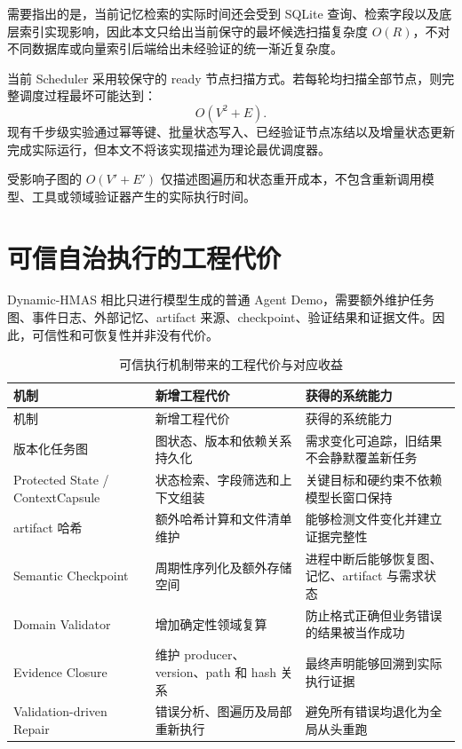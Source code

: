 \documentclass[UTF8,a4paper,12pt,oneside]{ctexbook}
\begin{document}
需要指出的是，当前记忆检索的实际时间还会受到 SQLite 查询、检索字段以及底层索引实现影响，因此本文只给出当前保守的最坏候选扫描复杂度 $O(R)$，不对不同数据库或向量索引后端给出未经验证的统一渐近复杂度。

当前 Scheduler 采用较保守的 ready 节点扫描方式。若每轮均扫描全部节点，则完整调度过程最坏可能达到：
\[
O(V^2+E).
\]
现有千步级实验通过幂等键、批量状态写入、已经验证节点冻结以及增量状态更新完成实际运行，但本文不将该实现描述为理论最优调度器。

受影响子图的 $O(V'+E')$ 仅描述图遍历和状态重开成本，不包含重新调用模型、工具或领域验证器产生的实际执行时间。


\section{可信自治执行的工程代价}

Dynamic-HMAS 相比只进行模型生成的普通 Agent Demo，需要额外维护任务图、事件日志、外部记忆、artifact 来源、checkpoint、验证结果和证据文件。因此，可信性和可恢复性并非没有代价。

\begin{longtable}{p{}p{}p{}}
\caption{可信执行机制带来的工程代价与对应收益}
\label{tab:engineering-cost}\\
\toprule
机制 & 新增工程代价 & 获得的系统能力\\
\midrule
\endfirsthead

\toprule
机制 & 新增工程代价 & 获得的系统能力\\
\midrule
\endhead

版本化任务图
&
图状态、版本和依赖关系持久化
&
需求变化可追踪，旧结果不会静默覆盖新任务
\\

Protected State / ContextCapsule
&
状态检索、字段筛选和上下文组装
&
关键目标和硬约束不依赖模型长窗口保持
\\

artifact 哈希
&
额外哈希计算和文件清单维护
&
能够检测文件变化并建立证据完整性
\\

Semantic Checkpoint
&
周期性序列化及额外存储空间
&
进程中断后能够恢复图、记忆、artifact 与需求状态
\\

Domain Validator
&
增加确定性领域复算
&
防止格式正确但业务错误的结果被当作成功
\\

Evidence Closure
&
维护 producer、version、path 和 hash 关系
&
最终声明能够回溯到实际执行证据
\\

Validation-driven Repair
&
错误分析、图遍历及局部重新执行
&
避免所有错误均退化为全局从头重跑
\\

\bottomrule
\end{longtable}
\end{document}
